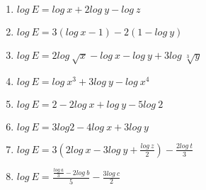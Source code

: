 \begin{enumerate}[topsep=0pt]

	\item $log~E =  log~x + 2 log~y - log~z$

	\item $log~E = 3(log~x -1) - 2(1-log~y)$

	\item $log~E = 2 log~\sqrt{x} - log~x - log~y + 3 log~\sqrt[3]{y}$

	\item $log~E = log~x^3 + 3 log~y - log~x^4$
	
	\item $log~E = 2 - 2 log~x + log~y - 5 log~2$
	
	\item $log~E = 3 log 2 - 4 log~x + 3 log~y$
	
	\item $log~E = 3 (2log~x - 3 log~y +\frac{log~z}{2})-\frac{2 log~t}{3}$
	
	\item $log~E = \frac{\frac{log~a}{3} - 2 log~b}{5} - \frac{3 log~c}{2}$

\end{enumerate}